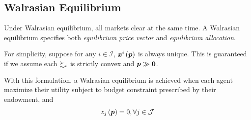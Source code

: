 \subsection{Walrasian Equilibrium}\label{walrasian-equilibrium}


Under Walrasian equilibrium, all markets clear at the same time. A
Walrasian equilibrium specifies both \textit{equilibrium price vector} and \textit{equilibrium allocation}.

For simplicity, suppose for any \(i\in \mathcal I\), \(\bm x^i\left(\bm p\right)\) is
always unique. This is guaranteed if we assume each
\(\succsim_i\) is strictly convex and \(\bm p\gg \textbf 0\).


With this formulation, a Walrasian equilibrium is achieved when each agent maximize their utility subject to budget constraint prescribed by their endowment, and
\[z_j\left(\bm p\right) = 0,\forall j\in \mathcal J\]

